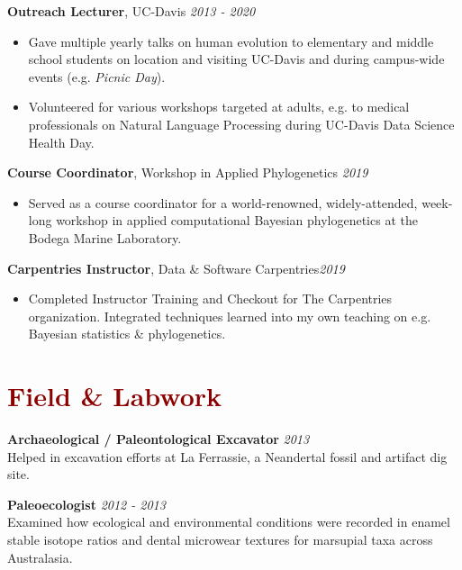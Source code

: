 \documentclass[11pt,margin,line]{resume}
\begin{document}
\begin{resume}
\textbf{Outreach Lecturer}, UC-Davis \hfill \emph{2013  - 2020}\\
\begin{itemize}[noitemsep]
\vspace{-4.5mm} \item Gave multiple yearly talks on human evolution to elementary and middle school students on location and visiting UC-Davis and during campus-wide events (e.g. \emph{Picnic Day}). 
\item Volunteered for various workshops targeted at adults, e.g. to medical professionals on Natural Language Processing during UC-Davis Data Science Health Day.
\end{itemize}
\vspace{-1.5mm}

\textbf{Course Coordinator}, Workshop in Applied Phylogenetics \hfill \emph{2019}
\begin{itemize}[noitemsep]
\item Served as a course coordinator for a world-renowned, widely-attended, week-long workshop in applied computational Bayesian phylogenetics at the Bodega Marine Laboratory.
\end{itemize}
\vspace{-1.5mm}

\textbf{Carpentries Instructor}, Data \& Software Carpentries\hfill \emph{2019}
\begin{itemize}[noitemsep]
\item Completed Instructor Training and Checkout for The Carpentries organization. Integrated techniques learned into my own teaching on e.g. Bayesian statistics \& phylogenetics.\\
\end{itemize}
\vspace{-4.5mm}

\section{\large\textcolor{DarkRed}{Field \& Labwork}}

\textbf{Archaeological / Paleontological Excavator} \hfill \emph{2013}\\
Helped in excavation efforts at La Ferrassie, a Neandertal fossil and artifact dig site.
\vspace{-1.5mm}

\textbf{Paleoecologist} \hfill \emph{2012 - 2013}\\
Examined how ecological and environmental conditions were recorded in enamel stable isotope ratios and dental microwear textures for marsupial taxa across Australasia.
\vspace{-1.5mm}


\end{resume}
\end{document}
